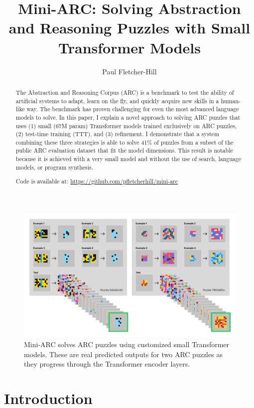 \documentclass[10pt,twocolumn]{article}
\title{Mini-ARC: Solving Abstraction and Reasoning Puzzles with Small
Transformer Models}
\author{Paul Fletcher-Hill}
\begin{document}
\maketitle

\begin{figure}[t!]
  \centering
  \includegraphics[width=\textwidth]{figures/header.png}
  \caption{Mini-ARC solves ARC puzzles using customized small
    Transformer models. These are real predicted outputs for two ARC
  puzzles as they progress through the Transformer encoder layers.}
  \label{fig:top-image}
\end{figure}

\begin{abstract}
  The Abstraction and Reasoning Corpus (ARC)\cite{arc} is a benchmark
  to test the ability of artificial systems to adapt, learn on the
  fly, and quickly acquire new skills in a human-like way. The
  benchmark has proven challenging for even the most advanced
  language models to solve. In this paper, I explain a novel approach
  to solving ARC puzzles that uses (1) small (67M param) Transformer models
  trained exclusively on ARC puzzles, (2) test-time training (TTT),
  and (3) refinement. I demonstrate that a system combining these
  three strategies is able to solve 41\% of puzzles from a subset of
  the public ARC evaluation dataset that fit the model dimensions.
  This result is notable because
  it is achieved with a very small model and without the use of
  search, language models, or program synthesis.

  Code is available at: \url{https://github.com/pfletcherhill/mini-arc}
\end{abstract}

\section{Introduction}
\end{document}
